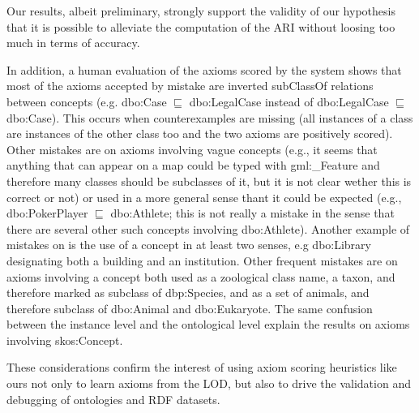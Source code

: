 \documentclass{llncs}
\begin{document}
Our results, albeit preliminary, strongly support the validity of our hypothesis
that it is possible to alleviate the computation of the ARI without loosing too much
in terms of accuracy.

In addition, a human evaluation of the axioms scored by the system shows that
most of the axioms accepted by mistake are inverted \textsf{subClassOf} relations between concepts (e.g. \textsf{dbo:Case} $\sqsubseteq$ \textsf{dbo:LegalCase} instead of \textsf{dbo:LegalCase} $\sqsubseteq$ \textsf{dbo:Case}). This occurs when counterexamples are missing (all instances of a class are instances of the other class too and the two axioms are positively scored).
Other mistakes are on axioms involving vague concepts (e.g., it seems that anything that can appear on a map could be typed with \textsf{gml:\_Feature} and therefore many classes should be subclasses of it, but it is not clear wether this is correct or not) or used in a more general sense thant it could be expected (e.g., \textsf{dbo:PokerPlayer} $\sqsubseteq$ \textsf{dbo:Athlete}; this is not really a mistake in the sense that there are several other such concepts involving \textsf{dbo:Athlete}).
Another example of mistakes on is the use of a concept in at least two senses, e.g \textsf{dbo:Library} designating both a building and an institution.
Other frequent mistakes are on axioms involving a concept both used as a zoological class name, a taxon, and therefore marked as subclass of \textsf{dbp:Species}, and as a set of animals, and therefore subclass of \textsf{dbo:Animal} and \textsf{dbo:Eukaryote}.
The same confusion between the instance level and the ontological level explain the results on axioms involving \textsf{skos:Concept}.
 



These considerations confirm the interest of using axiom scoring heuristics like ours
not only to learn axioms from the LOD, but also to drive the validation and debugging of ontologies and RDF datasets.



\end{document}
